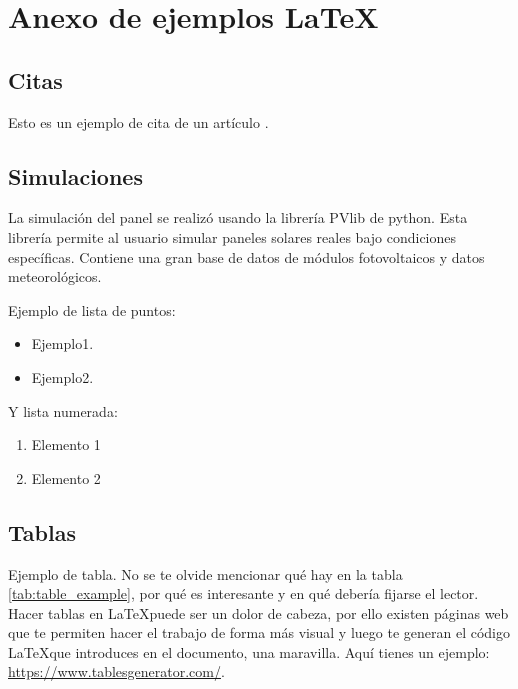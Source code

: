 \chapter{Anexo de ejemplos LaTeX}

\section{Citas}


Esto es un ejemplo de cita de un artículo \cite{Brunete:2013}.


\section{Simulaciones}


La simulación del panel se realizó usando la librería PVlib de python. Esta librería permite al usuario simular paneles solares reales bajo condiciones específicas. Contiene una gran base de datos de módulos fotovoltaicos y datos meteorológicos.



Ejemplo de lista de puntos:
\begin{itemize}
\item Ejemplo1.
\item Ejemplo2.
\end{itemize} 

Y lista numerada:
\begin{enumerate}
\item Elemento 1
\item Elemento 2
\end{enumerate}

\section{Tablas}

Ejemplo de tabla. No se te olvide mencionar qué hay en la tabla \ref{tab:table_example}, por qué es interesante y en qué debería fijarse el lector. Hacer tablas en \LaTeX puede ser un dolor de cabeza, por ello existen páginas web que te permiten hacer el trabajo de forma más visual y luego te generan el código \LaTeX  que introduces en el documento, una maravilla. Aquí tienes un ejemplo: \href{https://www.tablesgenerator.com/}{https://www.tablesgenerator.com/}.

